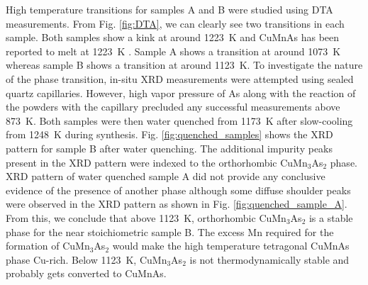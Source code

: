 \documentclass[10pt,doublespacing,edeposit]{uiucthesis2020}
\begin{document}
\begin{mainmatter}
High temperature transitions for samples A and B were studied using DTA measurements. From Fig. \ref{fig:DTA}, we can clearly see two transitions in each sample. Both samples show a kink at around 1223~K and CuMnAs has been reported to melt at 1223~K \cite{Uhlirova2019}. Sample A shows a transition at around 1073~K whereas sample B shows a transition at around 1123~K. To investigate the nature of the phase transition, in-situ XRD measurements were attempted using sealed quartz capillaries.
However, high vapor pressure of As along with the reaction of the powders with the capillary precluded any successful measurements above 873~K.
Both samples were then water quenched from 1173~K after slow-cooling from 1248~K during synthesis. Fig. \ref{fig:quenched_samples} shows the XRD pattern for sample B after water quenching. The additional impurity peaks present in the XRD pattern were indexed to the orthorhombic CuMn$_3$As$_2$ phase.
XRD pattern of water quenched sample A did not provide any conclusive evidence of the presence of another phase although some diffuse shoulder peaks were observed in the XRD pattern as shown in Fig. \ref{fig:quenched_sample_A}. From this, we conclude that above 1123~K, orthorhombic CuMn$_3$As$_2$ is a stable phase for the near stoichiometric sample B. The excess Mn required for the formation of CuMn$_3$As$_2$ would make the high temperature tetragonal CuMnAs phase Cu-rich. Below 1123~K, CuMn$_3$As$_2$ is not thermodynamically stable and probably gets converted to CuMnAs. 



\end{mainmatter}
\end{document}
